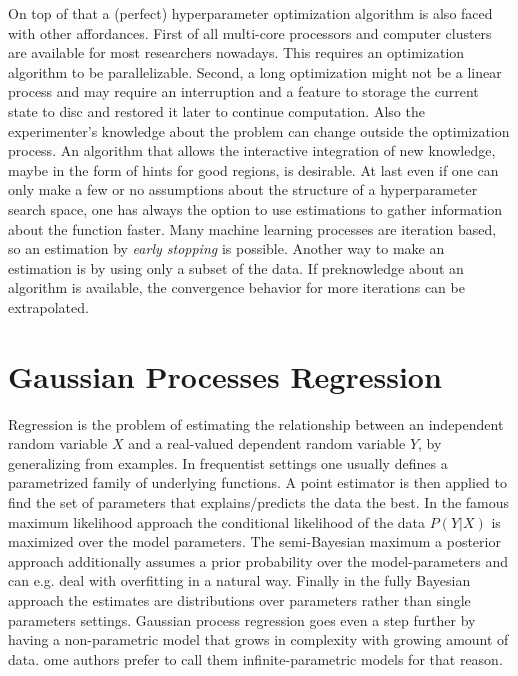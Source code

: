 \documentclass[english]{article}
\begin{document}
On top of that a (perfect) hyperparameter optimization algorithm is also faced with other affordances. First of all multi-core processors and computer clusters are available for most researchers nowadays. This requires an optimization algorithm to be parallelizable. Second, a long optimization might not be a linear process and may require an interruption and a feature to storage the current state to disc and restored it later to continue computation. Also the experimenter's knowledge about the problem can change outside the optimization process. An algorithm that allows the interactive integration of new knowledge, maybe in the form of hints for good regions, is desirable.
At last even if one can only make a few or no assumptions about the structure of a hyperparameter search space, one has always the option to use estimations to gather information about the function faster. Many machine learning processes are iteration based, so an estimation by \textit{early stopping} is possible. Another way to make an estimation is by using only a subset of the data. If preknowledge about an algorithm is available, the convergence behavior for more iterations can be extrapolated.



\section{Gaussian Processes Regression}
\label{GPR}
Regression is the problem of estimating the relationship between an independent random variable $X$ and a real-valued dependent random variable $Y$, by generalizing from examples. In frequentist settings one usually defines a parametrized family of underlying functions. A point estimator is then applied to find the set of parameters that explains/predicts the data the best. In the famous maximum likelihood approach the conditional likelihood of the data $P(Y|X)$ is maximized over the model parameters. The semi-Bayesian maximum a posterior approach additionally assumes a prior probability over the model-parameters and can e.g. deal with overfitting in a natural way. Finally in the fully Bayesian approach the estimates are distributions over parameters rather than single parameters settings. Gaussian process regression goes even a step further by having a non-parametric model that grows in complexity with growing amount of data. ome authors prefer to call them infinite-parametric models for that reason.
\end{document}
